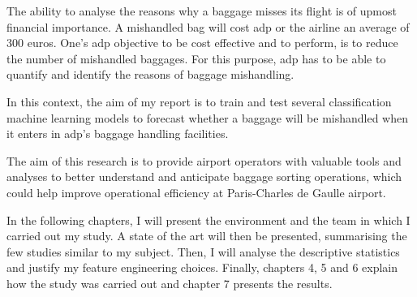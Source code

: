 \documentclass[12pt]{article}
\begin{document}
The ability to analyse the reasons why a baggage misses its flight is of upmost financial importance. A mishandled bag will cost \acrshort{adp} or the airline an average of 300 euros. One's \acrshort{adp} objective to be cost effective and to perform, is to reduce the number of mishandled baggages. For this purpose, \acrshort{adp} has to be able to quantify and identify the reasons of baggage mishandling. \hfill \break

In this context, the aim of my report is to train and test several classification machine learning models to forecast whether a baggage will be mishandled when it enters in \acrshort{adp}'s baggage handling facilities.\hfill \break 


The aim of this research is to provide airport operators with valuable tools and analyses to better understand and anticipate baggage sorting operations, which could help improve operational efficiency at Paris-Charles de Gaulle airport. \hfill \break



In the following chapters, I will present the environment and the team in which I carried out my study. A state of the art will then be presented, summarising the few studies similar to my subject. Then, I will analyse the descriptive statistics and justify my feature engineering choices. Finally, chapters 4, 5 and 6 explain how the study was carried out and chapter 7 presents the results.




\end{document}
